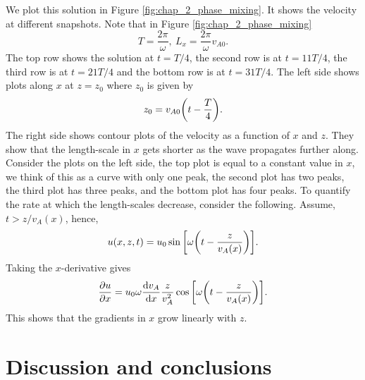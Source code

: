 We plot this solution in Figure \ref{fig:chap_2_phase_mixing}. It shows the velocity at different snapshots. Note that in Figure \ref{fig:chap_2_phase_mixing}
\[T=\frac{2\pi}{\omega},\ L_x = \frac{2\pi}{\omega}v_{A0}.\]
The top row shows the solution at $t=T/4$, the second row is at $t = 11T/4$, the third row is at $t = 21 T/4$ and the bottom row is at $t = 31 T/4$. The left side shows plots along $x$ at $z=z_0$ where $z_0$ is given by
\[z_0 = v_{A0}\qty(t - \frac{T}{4}).\]
The right side shows contour plots of the velocity as a function of $x$ and $z$. They show that the length-scale in $x$ gets shorter as the wave propagates further along. Consider the plots on the left side, the top plot is equal to a constant value in $x$, we think of this as a curve with only one peak, the second plot has two peaks, the third plot has three peaks, and the bottom plot has four peaks. To quantify the rate at which the length-scales decrease, consider the following.
Assume, $t>z/v_A(x)$, hence,
\begin{equation}
    u(x,z,t) = u_0\sin\qty[\omega\qty(t - \frac{z}{v_A(x)})].
\end{equation}
Taking the $x$-derivative gives
\begin{equation}
    \label{eq:phase_mixing_du_dx}
    \pdv{u}{x} = u_0\omega \dv{v_A}{x}\frac{z}{v_A^2}\cos\qty[\omega\qty(t - \frac{z}{v_A(x)})].
\end{equation}
This shows that the gradients in $x$ grow linearly with $z$.

\section{Discussion and conclusions}

